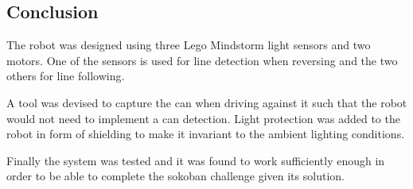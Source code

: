 
\subsection{Conclusion}
The robot was designed using three Lego Mindstorm light sensors and two motors.
One of the sensors is used for line detection when reversing and the two others for line following.

A tool was devised to capture the can when driving against it such that the robot would not need to implement a can detection.
Light protection was added to the robot in form of shielding to make it invariant to the ambient lighting conditions.

Finally the system was tested and it was found to work sufficiently enough in order to be able to complete the sokoban challenge given its solution.
